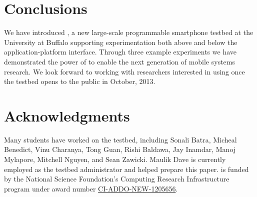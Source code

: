 \section{Conclusions}
\label{sec-conclusions}

We have introduced \PhoneLab{}, a new large-scale programmable smartphone
testbed at the University at Buffalo supporting experimentation both above
and below the application-platform interface. Through three example
experiments we have demonstrated the power of \PhoneLab{} to enable the next
generation of mobile systems research. We look forward to working with
researchers interested in using \PhoneLab{} once the testbed opens to the
public in October, 2013.

\newpage

\section*{Acknowledgments}

Many students have worked on the \PhoneLab{} testbed, including Sonali Batra,
Micheal Benedict, Vinu Charanya, Tong Guan, Rishi Baldawa, Jay Inamdar, Manoj
Mylapore, Mitchell Nguyen, and Sean Zawicki. Maulik Dave is currently
employed as the testbed administrator and helped prepare this paper.
\PhoneLab{} is funded by the National Science Foundation's Computing Research
Infrastructure program under award number
\href{http://www.nsf.gov/awardsearch/showAward?AWD\_ID=1205656}{CI-ADDO-NEW-1205656}.
